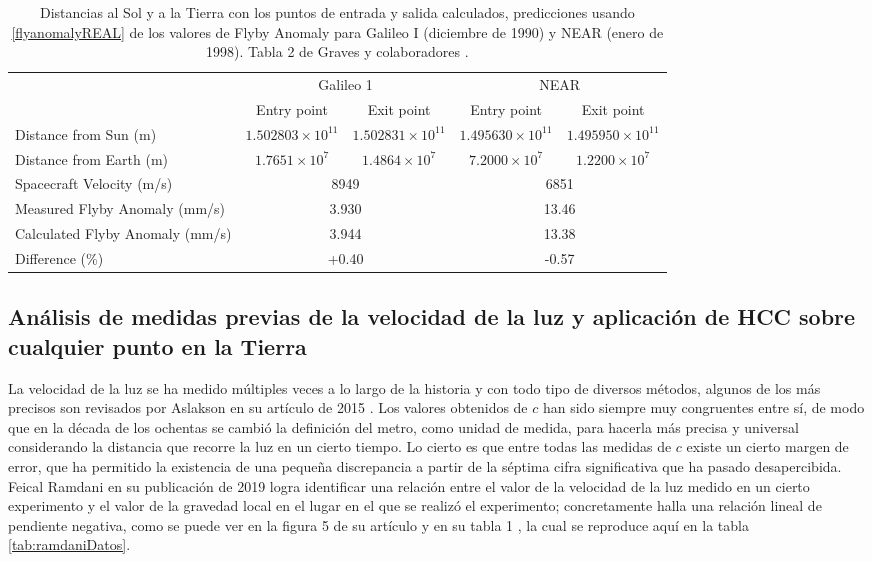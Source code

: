 \begin{table}[h!] 
\centering
\renewcommand{\arraystretch}{1.5}
\scriptsize
\begin{tabular}{lcccc}
\hline
 & \multicolumn{2}{c}{Galileo 1} & \multicolumn{2}{c}{NEAR} \\
 & Entry point & Exit point & Entry point & Exit point \\
\hline
Distance from Sun (m) & $1.502803 \times 10^{11}$ & $1.502831 \times 10^{11}$ & $1.495630 \times 10^{11}$ & $1.495950 \times 10^{11}$ \\
Distance from Earth (m) & $1.7651 \times 10^{7}$ & $1.4864 \times 10^{7}$ & $7.2000 \times 10^{7}$ & $1.2200 \times 10^{7}$ \\
Spacecraft Velocity (m/s) &\multicolumn{2}{c}{8949}    & \multicolumn{2}{c}{6851}  \\
Measured Flyby Anomaly (mm/s) &\multicolumn{2}{c}{3.930} &\multicolumn{2}{c}{13.46}  \\
Calculated Flyby Anomaly (mm/s) &\multicolumn{2}{c}{3.944}   &\multicolumn{2}{c}{13.38}  \\
Difference (\%) &\multicolumn{2}{c}{+0.40}  &\multicolumn{2}{c}{-0.57} \\
\hline
\end{tabular}
\caption{Distancias al Sol y a la Tierra con los puntos de entrada y salida calculados, predicciones usando \eqref{flyanomalyREAL} de los valores de Flyby Anomaly para Galileo I (diciembre de 1990) y NEAR (enero de 1998). Tabla 2 de Graves y colaboradores \cite{Greavesflyby}.} \label{tab:resultadoflyanomaly}
\end{table}

\subsection{Análisis de medidas previas de la velocidad de la luz y aplicación de HCC sobre cualquier punto en la Tierra}

La velocidad de la luz se ha medido múltiples veces a lo largo de la historia y con todo tipo de diversos métodos, algunos de los más precisos son revisados por Aslakson en su artículo de 2015 \cite{Aslakson2015}. Los valores obtenidos de $c$ han sido siempre muy congruentes entre sí, de modo que en la década de los ochentas se cambió la definición del metro, como unidad de medida, para hacerla más precisa y universal considerando la distancia que recorre la luz en un cierto tiempo. 
Lo cierto es que entre todas las medidas de $c$ existe un cierto margen de error, que ha permitido la existencia de una pequeña discrepancia a partir de la séptima cifra significativa que ha pasado desapercibida. Feical Ramdani en su publicación de 2019 \cite{ramdani} logra identificar una relación entre el valor de la velocidad de la luz medido en un cierto experimento y el valor de la gravedad local en el lugar en el que se realizó el experimento; concretamente halla una relación lineal de pendiente negativa, como se puede ver en la figura 5 de su artículo y en su tabla 1 \cite{ramdani}, la cual se reproduce aquí en la tabla \ref{tab:ramdaniDatos}.

